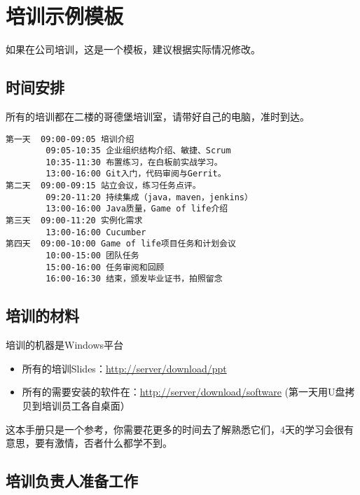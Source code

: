 \chapter{培训示例模板}
\label{培训示例模板}

如果在公司培训，这是一个模板，建议根据实际情况修改。

\section{时间安排}
\label{时间安排}

所有的培训都在二楼的哥德堡培训室，请带好自己的电脑，准时到达。

\begin{verbatim}
第一天  09:00-09:05 培训介绍
        09:05-10:35 企业组织结构介绍、敏捷、Scrum
        10:35-11:30 布置练习，在白板前实战学习。
        13:00-16:00 Git入门，代码审阅与Gerrit。
第二天  09:00-09:15 站立会议，练习任务点评。
        09:20-11:20 持续集成（java，maven，jenkins）
        13:00-16:00 Java质量，Game of life介绍
第三天  09:00-11:20 实例化需求
        13:00-16:00 Cucumber
第四天  09:00-10:00 Game of life项目任务和计划会议
        10:00-15:00 团队任务
        15:00-16:00 任务审阅和回顾
        16:00-16:30 结束，颁发毕业证书，拍照留念 
\end{verbatim}

\section{培训的材料}
\label{培训的材料}

培训的机器是Windows平台

\begin{itemize}
\item 所有的培训Slides：\href{http://server/download/ppt}{http:/\slash server\slash download\slash ppt}

\item 所有的需要安装的软件在：\href{http://server/download/software}{http:/\slash server\slash download\slash software} (第一天用U盘拷贝到培训员工各自桌面）

\end{itemize}

这本手册只是一个参考，你需要花更多的时间去了解熟悉它们，4天的学习会很有意思，要有激情，否者什么都学不到。

\section{培训负责人准备工作}
\label{培训负责人准备工作}


